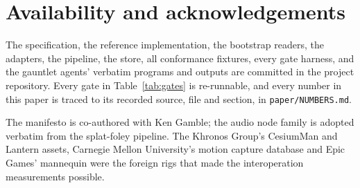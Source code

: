 \documentclass[10pt,twocolumn,letterpaper]{article}
\newcommand{\code}[1]{\texttt{\small #1}}
\begin{document}
\section*{Availability and acknowledgements}

The specification, the reference implementation, the bootstrap readers, the
adapters, the pipeline, the store, all conformance fixtures, every gate harness,
and the gauntlet agents' verbatim programs and outputs are committed in the
project repository. Every gate in Table~\ref{tab:gates} is re-runnable, and every
number in this paper is traced to its recorded source, file and section, in
\code{paper/NUMBERS.md}.

The manifesto is co-authored with Ken Gamble; the audio node family is adopted
verbatim from the splat-foley pipeline. The Khronos Group's CesiumMan and Lantern
assets, Carnegie Mellon University's motion capture database and Epic Games'
mannequin were the foreign rigs that made the interoperation measurements
possible.
\end{document}
